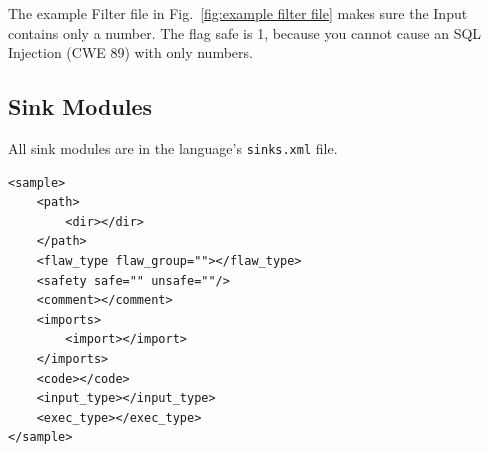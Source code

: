 The example Filter file in Fig.~\ref{fig:example filter file} makes sure
the Input contains only a number.  
The flag safe is 1, because you cannot cause an SQL Injection 
(CWE 89) with only numbers.


\subsection{Sink Modules}
\label{sec:sink modules}

All sink modules are in the language's \verb|sinks.xml| file.

\begin{verbatim}
<sample>
    <path>
        <dir></dir>
    </path>
    <flaw_type flaw_group=""></flaw_type>
    <safety safe="" unsafe=""/>
    <comment></comment>
    <imports>
        <import></import>
    </imports>
    <code></code>
    <input_type></input_type>
    <exec_type></exec_type>
</sample>
\end{verbatim}

